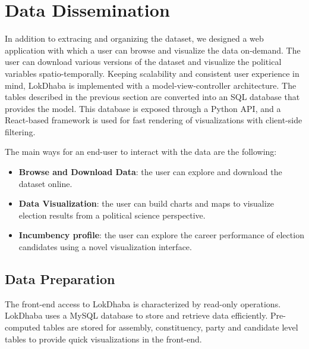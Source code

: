 

\section{Data Dissemination}

In addition to extracing and organizing the dataset, we designed a web application with which a user can browse and visualize the data on-demand. The user can download various versions of the dataset and visualize the political variables spatio-temporally. Keeping scalability and consistent user experience in mind, LokDhaba is implemented with a model-view-controller architecture. The tables described in the previous section are converted into an SQL database that provides the model. This database is exposed through a Python API, and a React-based framework is used for fast rendering of visualizations with client-side filtering.


The main ways for an end-user to interact with the data are the following:
\begin{itemize}
    \item \textbf{Browse and Download Data}: the user can explore and download the dataset online.
    \item \textbf{Data Visualization}: the user can build charts and maps to visualize election results from a political science perspective.
    \item \textbf{Incumbency profile}: the user can explore the career performance of election candidates using a novel visualization interface.
\end{itemize}

\subsection{Data Preparation}

The front-end access to LokDhaba is characterized by read-only operations. LokDhaba uses a MySQL database to store and retrieve data efficiently. Pre-computed tables are stored for assembly, constituency, party and candidate level tables to provide quick visualizations in the front-end.


